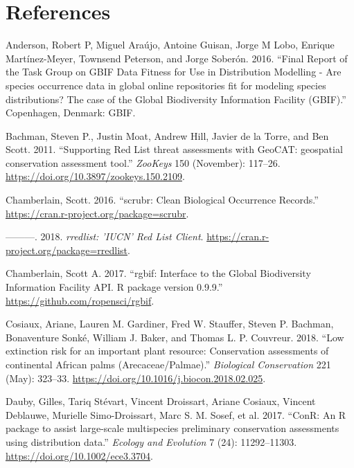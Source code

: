 \documentclass[fleqn,10pt,lineno]{wlpeerj} %
\begin{document}
\newpage{}

\hypertarget{references}{%
\section*{References}\label{references}}

\hypertarget{refs}{}
\leavevmode\hypertarget{ref-Anderson2016}{}%
Anderson, Robert P, Miguel Araújo, Antoine Guisan, Jorge M Lobo, Enrique Martínez-Meyer, Townsend Peterson, and Jorge Soberón. 2016. ``Final Report of the Task Group on GBIF Data Fitness for Use in Distribution Modelling - Are species occurrence data in global online repositories fit for modeling species distributions? The case of the Global Biodiversity Information Facility (GBIF).'' Copenhagen, Denmark: GBIF.

\leavevmode\hypertarget{ref-Bachman2011}{}%
Bachman, Steven P., Justin Moat, Andrew Hill, Javier de la Torre, and Ben Scott. 2011. ``Supporting Red List threat assessments with GeoCAT: geospatial conservation assessment tool.'' \emph{ZooKeys} 150 (November): 117--26. \url{https://doi.org/10.3897/zookeys.150.2109}.

\leavevmode\hypertarget{ref-Chamberlain2016}{}%
Chamberlain, Scott. 2016. ``scrubr: Clean Biological Occurrence Records.'' \url{https://cran.r-project.org/package=scrubr}.

\leavevmode\hypertarget{ref-Chamberlain2018}{}%
---------. 2018. \emph{rredlist: 'IUCN' Red List Client}. \url{https://cran.r-project.org/package=rredlist}.

\leavevmode\hypertarget{ref-Chamberlain2017}{}%
Chamberlain, Scott A. 2017. ``rgbif: Interface to the Global Biodiversity Information Facility API. R package version 0.9.9.'' \url{https://github.com/ropensci/rgbif}.

\leavevmode\hypertarget{ref-Cosiaux2018}{}%
Cosiaux, Ariane, Lauren M. Gardiner, Fred W. Stauffer, Steven P. Bachman, Bonaventure Sonké, William J. Baker, and Thomas L. P. Couvreur. 2018. ``Low extinction risk for an important plant resource: Conservation assessments of continental African palms (Arecaceae/Palmae).'' \emph{Biological Conservation} 221 (May): 323--33. \url{https://doi.org/10.1016/j.biocon.2018.02.025}.

\leavevmode\hypertarget{ref-Dauby2017}{}%
Dauby, Gilles, Tariq Stévart, Vincent Droissart, Ariane Cosiaux, Vincent Deblauwe, Murielle Simo-Droissart, Marc S. M. Sosef, et al. 2017. ``ConR: An R package to assist large-scale multispecies preliminary conservation assessments using distribution data.'' \emph{Ecology and Evolution} 7 (24): 11292--11303. \url{https://doi.org/10.1002/ece3.3704}.
\end{document}
